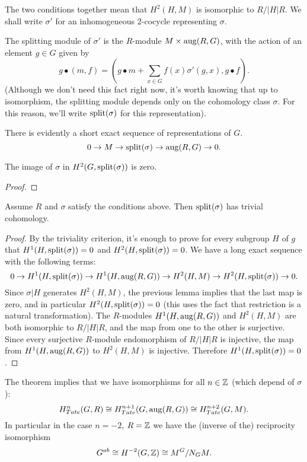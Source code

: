 The two conditions together mean that $H^2(H,M)$ is isomorphic to $R/|H|R$.
We shall write $\sigma'$ for an inhomogeneous 2-cocycle representing $\sigma$.

\begin{definition}
	The splitting module of $\sigma'$ is the $R$-module $M \times \mathrm{aug}(R,G)$,
	with the action of an element $g \in G$ given by
	\[
		g \bullet (m,f)
		= \left(g \bullet m + \sum_{x \in G} f(x) \sigma'(g,x) , g \bullet f\right).
	\]
	(Although we don't need this fact right now, it's worth knowing that up to isomorphism, the splitting module depends only on the cohomology class $\sigma$. For this reason, we'll write
	$\mathrm{split}(\sigma)$ for this representation).
\end{definition}



There is evidently a short exact sequence of representations of $G$.
\[
	0 \to M \to \mathrm{split}(\sigma) \to \mathrm{aug}(R,G) \to 0.
\]

\begin{lemma}
	The image of $\sigma$ in $H^2(G,\mathrm{split}(\sigma))$ is zero.
\end{lemma}

\begin{proof}

\end{proof}

\begin{theorem}
	Assume $R$ and $\sigma$ satisfy the conditions above.
	Then	$\mathrm{split}(\sigma)$ has trivial cohomology.
\end{theorem}

\begin{proof}
	By the triviality criterion, it's enough to prove for every subgroup $H$ of $g$ that
	$H^1(H,\mathrm{split}(\sigma))=0$ and $H^2(H,\mathrm{split}(\sigma))=0$.
	We have a long exact sequence with the following terms:
	\[
		0 \to H^1(H,\mathrm{split}(\sigma)) \to H^1(H,\mathrm{aug}(R,G)) \to H^2(H,M) \to H^2(H,\mathrm{split}(\sigma))
		\to 0.
	\]
	Since $\sigma|H$ generates $H^2(H,M)$, the previous lemma implies that the last map is zero,
	and in particular $H^2(H,\mathrm{split}(\sigma))=0$ (this uses the fact that restriction is a natural
	transformation).
	The $R$-modules $H^1(H,\mathrm{aug}(R,G))$ and $H^2(H,M)$ are both isomorphic to $R / |H|R$,
	and the map from one to the other is surjective.
	Since every surjective $R$-module endomorphism of $R /|H|R$ is injective, the map
	from $H^1(H,\mathrm{aug}(R,G))$ to $H^2(H,M)$ is injective.
	Therefore $H^1(H,\mathrm{split}(\sigma))=0$.
\end{proof}



The theorem implies that we have isomorphisms for all $n\in {\mathbb Z}$ (which depend of $\sigma$):
\[
	H^{n}_{Tate}(G,R) \cong H^{n+1}_{Tate}(G,\mathrm{aug}(R,G)) \cong H^{n+2}_{Tate}(G,M).
\]
In particular in the case $n = -2$, $R = {\mathbb Z}$ we have the (inverse of the) reciprocity isomorphism
\[
	G^{ab} \cong H^{-2}(G,{\mathbb Z}) \cong M^G / N_G M.
\]
